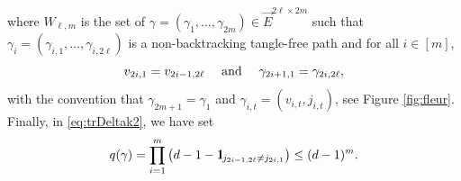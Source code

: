 \documentclass[11pt]{article}
\newcommand{\PAR}[1]{{{\left(#1\right)}}} %
\newcommand{\1}{1\!\!{\sf I}}\newcommand{\IND}{\1}
\begin{document}
where $W_{\ell,m}$ is the set of $\gamma = ( \gamma_1, \ldots, \gamma_{2m}) \in \vec E^{2\ell \times 2m}$ such that $\gamma_i = (\gamma_{i,1}, \ldots, \gamma_{i,2\ell})$ is a non-backtracking tangle-free path and for all $i\in[m]$, 
\begin{equation}\label{eq:defbound}
v_{2i,1} = v_{2i-1, 2\ell}  \quad \hbox{ and } \quad  \gamma_{2i+1,1} = \gamma_{2i, 2\ell},
\end{equation}
with the convention that $\gamma_{2m+1} = \gamma_{1}$ and  $\gamma_{i,t} = (v_{i,t}, j_{i,t})$, see Figure \ref{fig:fleur}. Finally, in \eqref{eq:trDeltak2}, we have set
\begin{equation}\label{eq:defqg}
q(\gamma) = \prod_{i=1} ^{m} \PAR{ d -1 - \IND_{j_{2i-1,2\ell} \ne j_{2i,1}} }\leq (d-1)^m.
\end{equation}
\end{document}
